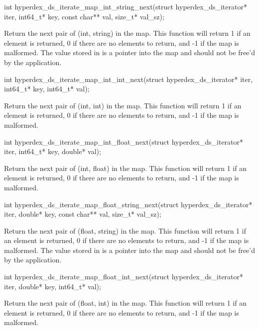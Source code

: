 \begin{ccode}
int hyperdex_ds_iterate_map_int_string_next(struct hyperdex_ds_iterator* iter,
                                            int64_t* key,
                                            const char** val, size_t* val_sz);
\end{ccode}
Return the next pair of (int, string) in the map.  This function will
return 1 if an element is returned, 0 if there are no elements to return, and -1
if the map is malformed.  The value stored in  is a pointer into the
map and should not be free'd by the application.

\begin{ccode}
int hyperdex_ds_iterate_map_int_int_next(struct hyperdex_ds_iterator* iter,
                                         int64_t* key, int64_t* val);
\end{ccode}
Return the next pair of (int, int) in the map.  This function will
return 1 if an element is returned, 0 if there are no elements to return, and -1
if the map is malformed.

\begin{ccode}
int hyperdex_ds_iterate_map_int_float_next(struct hyperdex_ds_iterator* iter,
                                           int64_t* key, double* val);
\end{ccode}
Return the next pair of (int, float) in the map.  This function will
return 1 if an element is returned, 0 if there are no elements to return, and -1
if the map is malformed.

\begin{ccode}
int hyperdex_ds_iterate_map_float_string_next(struct hyperdex_ds_iterator* iter,
                                              double* key,
                                              const char** val, size_t* val_sz);
\end{ccode}
Return the next pair of (float, string) in the map.  This function
will return 1 if an element is returned, 0 if there are no elements to return,
and -1 if the map is malformed.  The value stored in  is a pointer
into the map and should not be free'd by the application.

\begin{ccode}
int hyperdex_ds_iterate_map_float_int_next(struct hyperdex_ds_iterator* iter,
                                           double* key, int64_t* val);
\end{ccode}
Return the next pair of (float, int) in the map.  This function will
return 1 if an element is returned, 0 if there are no elements to return, and -1
if the map is malformed.

